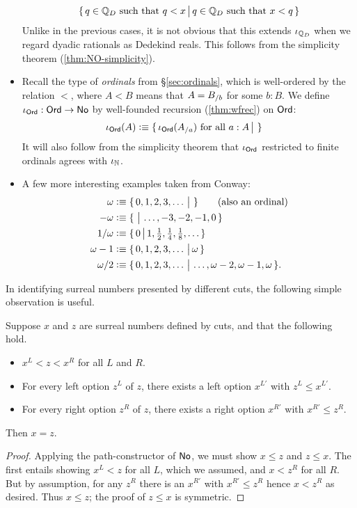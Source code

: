 \begin{itemize}
\begin{align*}
    \{\,q\in\mathbb{Q}_D \text{ such that } q<x\,\big|\,q\in\mathbb{Q}_D \text{ such that } x<q\,\}
  \end{align*}
  Unlike in the previous cases, it is not obvious that this extends $\iota_{\mathbb{Q}_D}$ when we regard dyadic rationals as Dedekind reals.
  This follows from the simplicity theorem (\autoref{thm:NO-simplicity}).
\item Recall the type \ord of \emph{ordinals} from \S\ref{sec:ordinals}, which is well-ordered by the relation $<$, where $A<B$ means that $A = {B}_{/b}$ for some $b:B$.
  We define $\iota_{\mathsf{Ord}}:\mathsf{Ord}\to\mathsf{No}$ by well-founded recursion (\autoref{thm:wfrec}) on $\mathsf{Ord}$:
  \begin{align*}
    \iota_{\mathsf{Ord}}(A) &\vcentcolon\equiv
    \{\,\iota_\mathsf{Ord}({A}_{/a}) \text{ for all } a:A\,\big|\,\,\}
  \end{align*}
  It will also follow from the simplicity theorem that $\iota_\mathsf{Ord}$ restricted to finite ordinals agrees with $\iota_\mathbb{N}$.
\item A few more interesting examples taken from Conway:
  \begin{align*}
    \omega &\vcentcolon\equiv \{\,0,1,2,3,\dots\,\big|\,\,\} \qquad\text{(also an ordinal)}\\
    -\omega &\vcentcolon\equiv \{\,\,\big|\,\dots,-3,-2,-1,0\,\}\\
    1/\omega &\vcentcolon\equiv \textstyle\{\,0\,\big|\,1,\frac12,\frac14,\frac18,\dots\,\}\\
    \omega-1 &\vcentcolon\equiv \{\,0,1,2,3,\dots\,\big|\,\omega\,\}\\
    \omega/2 &\vcentcolon\equiv \{\,0,1,2,3,\dots\,\big|\,\dots,\omega-2,\omega-1,\omega\,\}.
  \end{align*}
\end{itemize}

In identifying surreal numbers presented by different cuts, the following simple observation is useful.

\begin{thm}\label{thm:NO-simplicity}
  Suppose $x$ and $z$ are surreal numbers defined by cuts, and that the following hold.
  \begin{itemize}
  \item $x^L < z < x^R$ for all $L$ and $R$.
  \item For every left option $z^L$ of $z$, there exists a left option $x^{L'}$ with $z^L\le x^{L'}$.
  \item For every right option $z^R$ of $z$, there exists a right option $x^{R'}$ with $x^{R'}\le z^R$.
  \end{itemize}
  Then $x=z$.
\end{thm}
\begin{proof}
  Applying the path-constructor of $\mathsf{No}$, we must show $x\le z$ and $z\le x$.
  The first entails showing $x^L<z$ for all $L$, which we assumed, and $x<z^R$ for all $R$.
  But by assumption, for any $z^R$ there is an $x^{R'}$ with $x^{R'}\le z^R$ hence $x<z^R$ as desired.
  Thus $x\le z$; the proof of $z\le x$ is symmetric.
\end{proof}

